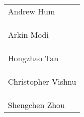 \documentclass[]{article}
\begin{document}
\vspace{2cm}

\begin{table}[H]
    \begin{tabular}{p{5cm}}
    \\
    \hline
    Andrew Hum
    \\\\\\\\
    \hline
    Arkin Modi
    \\\\\\\\
    \hline
    Hongzhao Tan
    \\\\\\\\
    \hline
    Christopher Vishnu
    \\\\\\\\
    \hline
    Shengchen Zhou
    \end{tabular}
\end{table}
\end{document}
